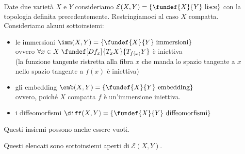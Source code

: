 


Date due varietà $X$ e $Y$ consideriamo $\mathcal E (X,Y)=\{ \fundef{X}{Y}\text{ lisce} \} $ con la topologia definita precedentemente. Restringiamoci al caso $X$ compatta. Consideriamo alcuni sottoinsiemi:
\begin{itemize}
\item le immersioni $\imm(X,Y) =\{\fundef{X}{Y}\text{ immersioni}\}$\\ovvero $\forall x \in X \; \fundef[Df_x]{T_xX}{T_{f(x)}Y}$ è iniettiva \\(la funzione tangente ristretta alla fibra $x$ che manda lo spazio tangente a $x$ nello spazio tangente a $f(x)$ è iniettiva)
\item gli embedding $\emb(X,Y)=\{\fundef{X}{Y}\text{ embedding}\}$\\ovvero, poiché $X$ compatta $f$ è un'immersione iniettiva.
\item i diffeomorfismi $\diff(X,Y)=\{\fundef{X}{Y}\text{ diffeomorfismi}\}$
\end{itemize}

\begin{oss}
Questi insiemi possono anche essere vuoti.
\end{oss}

\begin{teo}
Questi elencati sono sottoinsiemi aperti di $\mathcal E (X,Y)$.
\end{teo}

